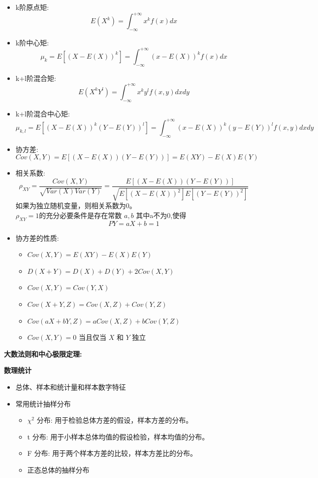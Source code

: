 \documentclass[10pt]{article}
\begin{document}
\begin{multicols}{2}
\begin{itemize}
\begin{itemize}
  \item k阶原点矩:
    \[
    E(X^k) = \int_{-\infty}^{+\infty} x^k f(x) dx
    \]
  \item k阶中心矩:
    \[
    \mu_k = E[(X - E(X))^k] = \int_{-\infty}^{+\infty} (x - E(X))^k f(x) dx   
    \]
  \item k+l阶混合矩:
    \[
    E(X^k Y^l) = \int_{-\infty}^{+\infty} x^k y^l f(x, y) dx dy
    \]
  \item k+l阶混合中心矩:
    \[
    \mu_{k,l} = E[(X - E(X))^k (Y - E(Y))^l] = \int_{-\infty}^{+\infty} (x - E(X))^k (y - E(Y))^l f(x, y) dx dy
    \]
  \item 协方差:
    \[
    Cov(X, Y) = E[(X - E(X))(Y - E(Y))] = E(XY) - E(X)E(Y)
    \]
  \item 相关系数:
    \[
    \rho_{XY} = \frac{Cov(X, Y)}{\sqrt{Var(X) Var(Y)}} = \frac{E[(X - E(X))(Y - E(Y))]}{\sqrt{E[(X - E(X))^2] E[(Y - E(Y))^2]}}
    \]
  如果为独立随机变量，则相关系数为0。\\
  \(\rho_{XY} = 1\)的充分必要条件是存在常数 \(a, b\) 其中a不为0,使得
  \[
    P{Y = aX + b} = 1
  \]

  \item 协方差的性质:
    \begin{itemize}
      \item \(Cov(X, Y) = E(XY) - E(X)E(Y)\)
      \item \(D(X + Y) = D(X) + D(Y) + 2Cov(X, Y)\)
      \item \(Cov(X, Y) = Cov(Y, X)\)
      \item \(Cov(X + Y, Z) = Cov(X, Z) + Cov(Y, Z)\)
      \item \(Cov(aX + bY, Z) = aCov(X, Z) + bCov(Y, Z)\)
      \item \(Cov(X, Y) = 0\) 当且仅当 \(X\) 和 \(Y\) 独立
    \end{itemize}

\end{itemize}

\end{itemize}


\textbf{大数法则和中心极限定理:}




\textbf{数理统计}

\begin{itemize}

\item 总体、样本和统计量和样本数字特征

\item 常用统计抽样分布
\begin{itemize}
  \item \(\chi^2\) 分布: 用于检验总体方差的假设，样本方差的分布。
  \item t 分布: 用于小样本总体均值的假设检验，样本均值的分布。
  \item F 分布: 用于两个样本方差的比较，样本方差比的分布。
  \item 正态总体的抽样分布
\end{itemize}


\end{itemize}
\end{multicols}
\end{document}
